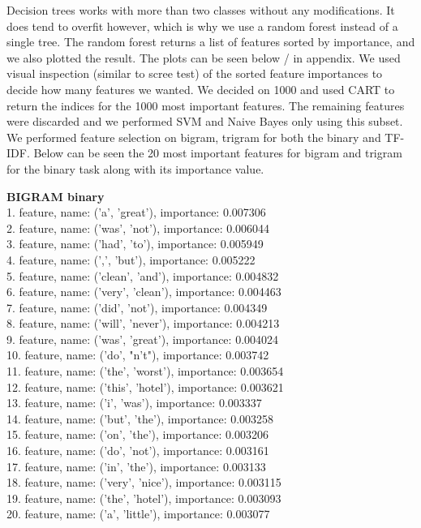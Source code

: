 \documentclass{article}
\begin{document}
Decision trees works with more than two classes without any modifications. It does tend to overfit however, which is why we use a random forest instead of a single tree. The random forest returns a list of features sorted by importance, and we also plotted the result. The plots can be seen below / in appendix. We used visual inspection (similar to scree test) of the sorted feature importances to decide how many features we wanted. We decided on 1000 and used CART to return the indices for the 1000 most important features. The remaining features were discarded and we performed SVM and Naive Bayes only using this subset. We performed feature selection on bigram, trigram for both the binary and TF-IDF. Below can be seen the 20 most important features for bigram and trigram for the binary task  along with its importance value. 
\vfill

\textbf{BIGRAM binary}\\
1. feature, name: ('a', 'great'), importance: 0.007306\\
2. feature, name: ('was', 'not'), importance: 0.006044\\
3. feature, name: ('had', 'to'), importance: 0.005949\\
4. feature, name: (',', 'but'), importance: 0.005222\\
5. feature, name: ('clean', 'and'), importance: 0.004832\\
6. feature, name: ('very', 'clean'), importance: 0.004463\\
7. feature, name: ('did', 'not'), importance: 0.004349\\
8. feature, name: ('will', 'never'), importance: 0.004213\\
9. feature, name: ('was', 'great'), importance: 0.004024\\
10. feature, name: ('do', "n't"), importance: 0.003742\\
11. feature, name: ('the', 'worst'), importance: 0.003654\\
12. feature, name: ('this', 'hotel'), importance: 0.003621\\
13. feature, name: ('i', 'was'), importance: 0.003337\\
14. feature, name: ('but', 'the'), importance: 0.003258\\
15. feature, name: ('on', 'the'), importance: 0.003206\\
16. feature, name: ('do', 'not'), importance: 0.003161\\
17. feature, name: ('in', 'the'), importance: 0.003133\\
18. feature, name: ('very', 'nice'), importance: 0.003115\\
19. feature, name: ('the', 'hotel'), importance: 0.003093\\
20. feature, name: ('a', 'little'), importance: 0.003077
\\
\end{document}

